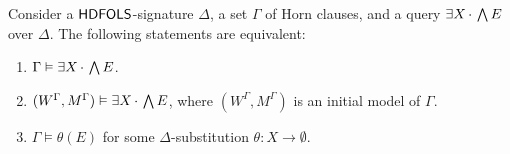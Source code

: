 \documentclass[a4paper,UKenglish,cleveref,autoref]{lipics-v2019}
\begin{document}
\begin{theorem} 
  \label{theorem:Herbrand}
  Consider a \({\mathsf{HDFOLS}}\)-signature \(\Delta\), a set\/ \(\Gamma\) of Horn clauses, and a query \(\exists X\,{\cdot}\, \bigwedge E\) over \(\Delta\).
  The following statements are equivalent:
  \begin{enumerate}
  \item \label{LP1} \(\Gamma \vDash \exists X\,{\cdot}\, \bigwedge E\).

  \item \label{LP2} \((W^{\Gamma}, M^{\Gamma}) \vDash \exists X\,{\cdot}\, \bigwedge E\), where \((W^{\Gamma}, M^{\Gamma})\) is an initial model of\/ \(\Gamma\).

  \item \label{LP3} \(\Gamma \models \theta(E)\) for some \(\Delta\)-substitution \(\theta \colon X \to \emptyset\).
  \end{enumerate}
\end{theorem}
\end{document}
